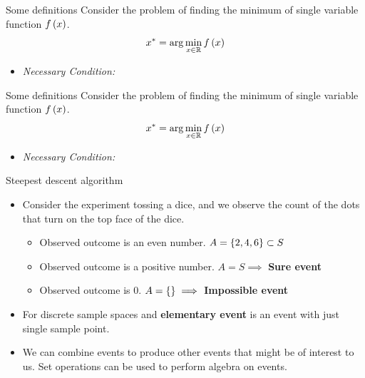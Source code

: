 \documentclass[aspectratio=169]{beamer}
\let\olditem\item
\renewcommand{\item}{\setlength{\itemsep}{\fill}\olditem}
\def\mb{\ensuremath\mathbb}
\def\lp{\ensuremath\left(}
\def\rp{\ensuremath\right)}
\def\lc{\ensuremath\left\{}
\def\rc{\ensuremath\right\}}
\newcommand{\ct}[1]{\lp #1\rp}
\begin{document}
\begin{frame}[t]{Some definitions}
  Consider the problem of finding the minimum of single variable function $f\ct{x}$.
  \[ x^{*} = \arg \min_{x \in \mb{R}} f\ct{x} \] 
\begin{itemize}
  \item \textit{Necessary Condition:} 
\end{itemize}
\end{frame}


\begin{frame}[t]{Some definitions}
  Consider the problem of finding the minimum of single variable function $f\ct{x}$.
  \[ x^{*} = \arg \min_{x \in \mb{R}} f\ct{x} \] 
\begin{itemize}
  \item \textit{Necessary Condition:} 
\end{itemize}
\end{frame}


\begin{frame}[t]{Steepest descent algorithm}
\begin{itemize}
  \item Consider the experiment tossing a dice, and we observe the count of the dots that turn on the top face of the dice.
  \begin{itemize}
    \item Observed outcome is an even number. $A = \lc 2, 4, 6\rc \subset S$
    \item Observed outcome is a positive number. $A = S \implies $ \textbf{Sure event}
    \item Observed outcome is 0. $A = \lc\rc \implies $ \textbf{Impossible event}
  \end{itemize}
  
  \item For discrete sample spaces and \textbf{elementary event} is an event with just single sample point.
  
  \item We can combine events to produce other events that might be of interest to us. Set operations can be used to perform algebra on events.
\end{itemize}
\end{frame}


  
\end{document}
